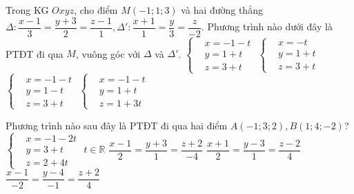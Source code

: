 \begin{ex}%
	Trong KG $Oxyz$, cho điểm $M(-1;1;3)$ và hai đường thẳng \break$\Delta\colon\dfrac{x-1}{3}=\dfrac{y+3}{2}=\dfrac{z-1}{1}, \Delta '\colon\dfrac{x+1}{1}=\dfrac{y}{3}=\dfrac{z}{-2}$. Phương trình nào dưới đây là PTĐT đi qua $M$, vuông góc với $\Delta $ và $\Delta '$. 
	\choice
	{\True $\left\{\begin{aligned}& x=-1-t \\
	& y=1+t \\
	& z=3+t 
	\end{aligned}\right.$	}
	{$\left\{\begin{aligned}& x=-t \\
	& y=1+t \\
	& z=3+t 
	\end{aligned}\right.$	}
	{$\left\{\begin{aligned}& x=-1-t \\
	& y=1-t \\
	& z=3+t 
	\end{aligned}\right.$	}
	{$\left\{\begin{aligned}& x=-1-t \\
	& y=1+t \\
	& z=1+3t 
	\end{aligned}\right.$}
\end{ex}
\begin{ex}%
	Phương trình nào sau đây là PTĐT đi qua hai điểm $A\left({-1;3;2}\right),B\left({1;4;-2}\right)$?
	\choice
	{$\left\{\begin{aligned}& x=-1-2t \\& y=3+t \\& z=2+4t 
	\end{aligned}\right. \,\, t\in \mathbb{R}$
	}
	{$\dfrac{x-1}{2}=\dfrac{y+3}{1}=\dfrac{z+2}{-4}$}
	{$\dfrac{x+1}{2}=\dfrac{y-3}{1}=\dfrac{z-2}{4}$}
	{\True $\dfrac{x-1}{-2}=\dfrac{y-4}{-1}=\dfrac{z+2}{4}$}
\end{ex}
